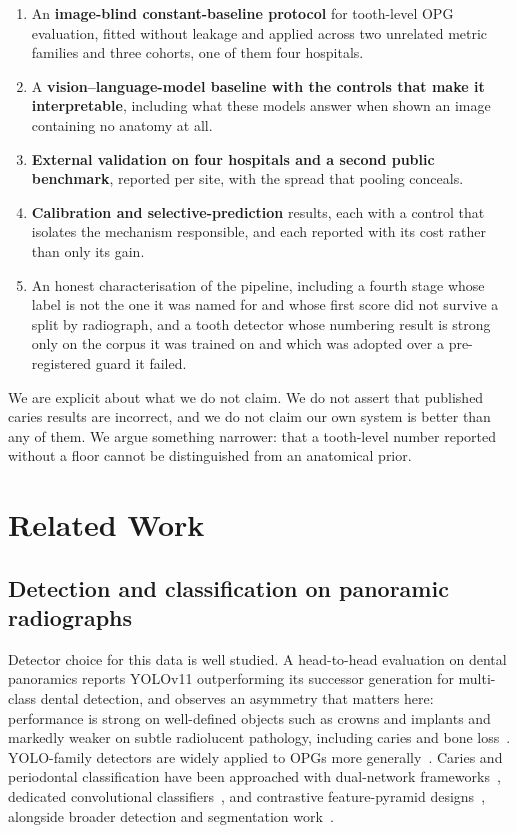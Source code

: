 \documentclass[conference]{IEEEtran}
\begin{document}
\begin{enumerate}
  \item An \textbf{image-blind constant-baseline protocol} for tooth-level OPG
        evaluation, fitted without leakage and applied across two unrelated
        metric families and three cohorts, one of them four hospitals.
  \item A \textbf{vision--language-model baseline with the controls that make it
        interpretable}, including what these models answer when shown an image
        containing no anatomy at all.
  \item \textbf{External validation on four hospitals and a second public benchmark}, reported per site, with
        the spread that pooling conceals.
  \item \textbf{Calibration and selective-prediction} results, each with a
        control that isolates the mechanism responsible, and each reported with
        its cost rather than only its gain.
  \item An honest characterisation of the pipeline, including a fourth stage
        whose label is not the one it was named for and whose first score did
        not survive a split by radiograph, and a tooth detector whose
        numbering result is strong only on the corpus it was trained on and
        which was adopted over a pre-registered guard it failed.
\end{enumerate}

We are explicit about what we do not claim. We do not assert that published
caries results are incorrect, and we do not claim our own system is better than
any of them. We argue something narrower: that a tooth-level number reported
without a floor cannot be distinguished from an anatomical prior.

\section{Related Work}

\subsection{Detection and classification on panoramic radiographs}
Detector choice for this data is well studied. A head-to-head evaluation on
dental panoramics reports YOLOv11 outperforming its successor generation for
multi-class dental detection, and observes an asymmetry that matters here:
performance is strong on well-defined objects such as crowns and implants and
markedly weaker on subtle radiolucent pathology, including caries and bone
loss~\cite{mutlu2026comparison}. YOLO-family detectors are widely applied to
OPGs more
generally~\cite{asif2026yolo26,nassiri2025yolo,eftimie2025tooth}. Caries and
periodontal classification have been approached with dual-network
frameworks~\cite{lim2024dual}, dedicated convolutional
classifiers~\cite{bilal2024pdcnet}, and contrastive feature-pyramid
designs~\cite{chen2024cariesxrays}, alongside broader detection and segmentation
work~\cite{chen2023deep,alharbi2023detection}.
\end{document}
